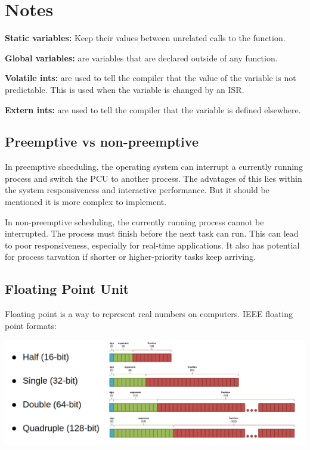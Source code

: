 \section{Notes}


\textbf{Static variables:} Keep their values between unrelated calls to the function.

\textbf{Global variables:} are variables that are declared outside of any function.

\textbf{Volatile ints:} are used to tell the compiler that the value of the variable
is not predictable. This is used when the variable is changed by an ISR.

\textbf{Extern ints:} are used to tell the compiler that the variable is defined elsewhere.

\subsection{Preemptive vs non-preemptive}

In preemptive shceduling, the operating system can interrupt a
currently running process and switch the PCU to another process.
The advatages of this lies within the system responsiveness and
interactive performance.
But it should be mentioned it is more complex to implement.



In non-preemptive scheduling, the currently running process
cannot be interrupted. The process must finish before the next
task can run. This can lead to poor responsiveness,
especially for real-time applications. It also has potential
for process tarvation if shorter or higher-priority tasks
keep arriving.

\subsection{Floating Point Unit}
Floating point is a way to represent real numbers on computers.
IEEE floating point formats:

\begin{center}
	\includegraphics[width=\textwidth]{images/FPU.png}
\end{center}


